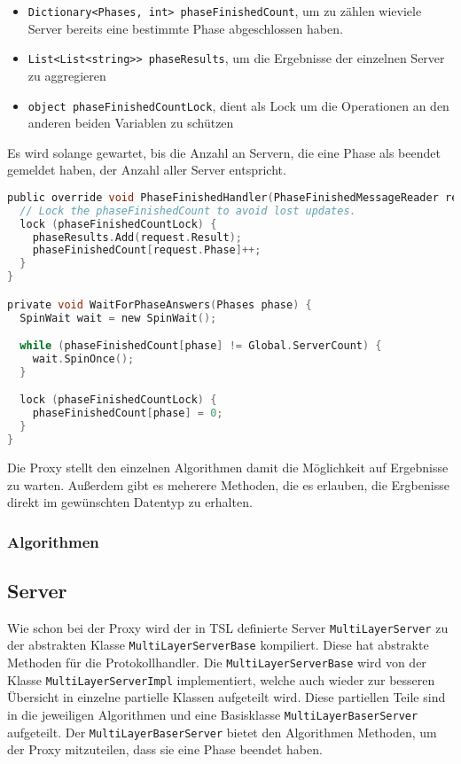 \begin{itemize}
  \item \verb|Dictionary<Phases, int> phaseFinishedCount|, um zu zählen wieviele Server bereits eine bestimmte Phase abgeschlossen haben.
  \item \verb|List<List<string>> phaseResults|, um die Ergebnisse der einzelnen Server zu aggregieren
  \item \verb|object phaseFinishedCountLock|, dient als Lock um die Operationen an den anderen beiden Variablen zu schützen
\end{itemize}

Es wird solange gewartet, bis die Anzahl an Servern, die eine Phase als beendet gemeldet haben, der Anzahl aller Server entspricht.

\begin{lstlisting}[language=c, caption={Implementierung des Mechanismus, um auf Phasen zu warten.}]
public override void PhaseFinishedHandler(PhaseFinishedMessageReader request) {
  // Lock the phaseFinishedCount to avoid lost updates.
  lock (phaseFinishedCountLock) {
    phaseResults.Add(request.Result);
    phaseFinishedCount[request.Phase]++;
  }
}

private void WaitForPhaseAnswers(Phases phase) {
  SpinWait wait = new SpinWait();

  while (phaseFinishedCount[phase] != Global.ServerCount) {
    wait.SpinOnce();
  }

  lock (phaseFinishedCountLock) {
    phaseFinishedCount[phase] = 0;
  }
}
\end{lstlisting}

Die Proxy stellt den einzelnen Algorithmen damit die Möglichkeit auf Ergebnisse zu warten. Außerdem gibt es meherere Methoden, die es erlauben, die Ergbenisse direkt im gewünschten Datentyp zu erhalten.

\subsubsection{Algorithmen}



\subsection{Server}

Wie schon bei der Proxy wird der in TSL definierte Server \verb|MultiLayerServer| zu der abstrakten Klasse \verb|MultiLayerServerBase| kompiliert. Diese hat abstrakte Methoden für die Protokollhandler.
Die \verb|MultiLayerServerBase| wird von der Klasse \verb|MultiLayerServerImpl| implementiert, welche auch wieder zur besseren Übersicht in einzelne partielle Klassen aufgeteilt wird. Diese partiellen Teile sind in die jeweiligen Algorithmen und eine Basisklasse \verb|MultiLayerBaserServer| aufgeteilt.
Der \verb|MultiLayerBaserServer| bietet den Algorithmen Methoden, um der Proxy mitzuteilen, dass sie eine Phase beendet haben.


